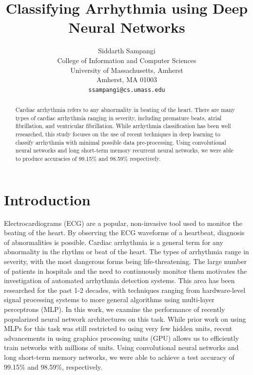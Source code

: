 \documentclass{article} %
\title{Classifying Arrhythmia using Deep Neural Networks}
\author{
Siddarth Sampangi \\
College of Information and Computer Sciences\\
University of Massachusetts, Amherst\\
Amherst, MA 01003 \\
\texttt{ssampangi@cs.umass.edu} \\
}
\begin{document}
\maketitle

\begin{abstract}
Cardiac arrhythmia refers to any abnormality in beating of the heart. There are many types of cardiac arrhythmia ranging in severity, including premature beats, atrial fibrillation, and ventricular fibrillation. While arrhythmia classification has been well researched, this study focuses on the use of recent techniques in deep learning to classify arrhythmia with minimal possible data pre-processing. Using convolutional neural networks and long short-term memory recurrent neural networks, we were able to produce accuracies of 99.15\% and 98.59\% respectively.
\end{abstract}

\section{Introduction}
Electrocardiograms (ECG) are a popular, non-invasive tool used to monitor the beating of the heart. By observing the ECG waveforms of a heartbeat, diagnosis of abnormalities is possible. Cardiac arrhythmia is a general term for any abnormality in the rhythm or beat of the heart. The types of arrhythmia range in severity, with the most dangerous forms being life-threatening. The large number of patients in hospitals and the need to continuously monitor them motivates the investigation of automated arrhythmia detection systems. This area has been researched for the past 1-2 decades, with techniques ranging from hardware-level signal processing systems to more general algorithms using multi-layer perceptrons (MLP). In this work, we examine the performance of recently popularized neural network architectures on this task. While prior work on using MLPs for this task was still restricted to using very few hidden units, recent advancements in using graphics processing units (GPU) allows us to efficiently train networks with millions of units. Using convolutional neural networks and long short-term memory networks, we were able to achieve a test accuracy of 99.15\% and 98.59\%, respectively.
\end{document}
